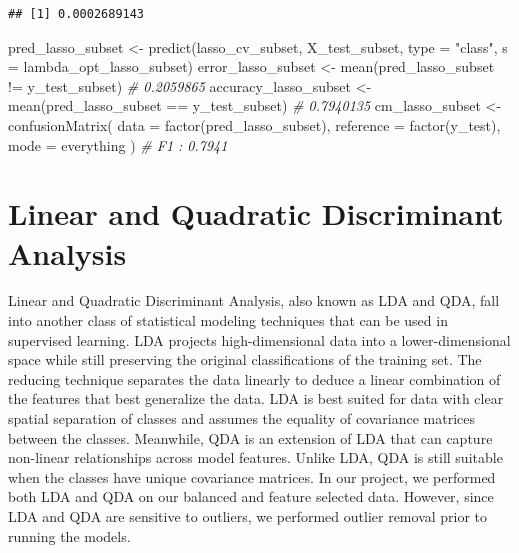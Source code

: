 \documentclass[
]{article}
\newenvironment{Shaded}{\begin{snugshade}}{\end{snugshade}}
\newcommand{\AttributeTok}[1]{\textcolor[rgb]{0.77,0.63,0.00}{#1}}
\newcommand{\CommentTok}[1]{\textcolor[rgb]{0.56,0.35,0.01}{\textit{#1}}}
\newcommand{\FunctionTok}[1]{\textcolor[rgb]{0.00,0.00,0.00}{#1}}
\newcommand{\NormalTok}[1]{#1}
\newcommand{\OtherTok}[1]{\textcolor[rgb]{0.56,0.35,0.01}{#1}}
\newcommand{\SpecialCharTok}[1]{\textcolor[rgb]{0.00,0.00,0.00}{#1}}
\newcommand{\StringTok}[1]{\textcolor[rgb]{0.31,0.60,0.02}{#1}}
\begin{document}
\begin{Shaded}
\end{Shaded}

\begin{verbatim}
## [1] 0.0002689143
\end{verbatim}

\begin{Shaded}
\begin{Highlighting}[]
\NormalTok{pred\_lasso\_subset }\OtherTok{\textless{}{-}}
  \FunctionTok{predict}\NormalTok{(lasso\_cv\_subset, X\_test\_subset, }\AttributeTok{type =} \StringTok{"class"}\NormalTok{, }
          \AttributeTok{s =}\NormalTok{ lambda\_opt\_lasso\_subset)}
\NormalTok{error\_lasso\_subset }\OtherTok{\textless{}{-}}
  \FunctionTok{mean}\NormalTok{(pred\_lasso\_subset }\SpecialCharTok{!=}\NormalTok{ y\_test\_subset) }\CommentTok{\# 0.2059865}
\NormalTok{accuracy\_lasso\_subset }\OtherTok{\textless{}{-}}
  \FunctionTok{mean}\NormalTok{(pred\_lasso\_subset }\SpecialCharTok{==}\NormalTok{ y\_test\_subset) }\CommentTok{\# 0.7940135}
\NormalTok{cm\_lasso\_subset }\OtherTok{\textless{}{-}}
  \FunctionTok{confusionMatrix}\NormalTok{(}
    \AttributeTok{data =} \FunctionTok{factor}\NormalTok{(pred\_lasso\_subset),}
    \AttributeTok{reference =} \FunctionTok{factor}\NormalTok{(y\_test),}
    \AttributeTok{mode =} \StringTok{\textquotesingle{}everything\textquotesingle{}}
\NormalTok{  ) }\CommentTok{\# F1 : 0.7941}
\end{Highlighting}
\end{Shaded}

\hypertarget{linear-and-quadratic-discriminant-analysis}{%
\section{Linear and Quadratic Discriminant
Analysis}\label{linear-and-quadratic-discriminant-analysis}}

Linear and Quadratic Discriminant Analysis, also known as LDA and QDA,
fall into another class of statistical modeling techniques that can be
used in supervised learning. LDA projects high-dimensional data into a
lower-dimensional space while still preserving the original
classifications of the training set. The reducing technique separates
the data linearly to deduce a linear combination of the features that
best generalize the data. LDA is best suited for data with clear spatial
separation of classes and assumes the equality of covariance matrices
between the classes. Meanwhile, QDA is an extension of LDA that can
capture non-linear relationships across model features. Unlike LDA, QDA
is still suitable when the classes have unique covariance matrices. In
our project, we performed both LDA and QDA on our balanced and feature
selected data. However, since LDA and QDA are sensitive to outliers, we
performed outlier removal prior to running the models.
\end{document}
